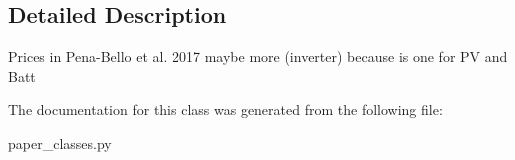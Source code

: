 \subsection{Detailed Description}
\begin{DoxyVerb}Prices in Pena-Bello et al. 2017 maybe more (inverter) because is one for PV and Batt
\end{DoxyVerb}
 

The documentation for this class was generated from the following file\+:\begin{DoxyCompactItemize}
\item 
paper\+\_\+classes.\+py\end{DoxyCompactItemize}
